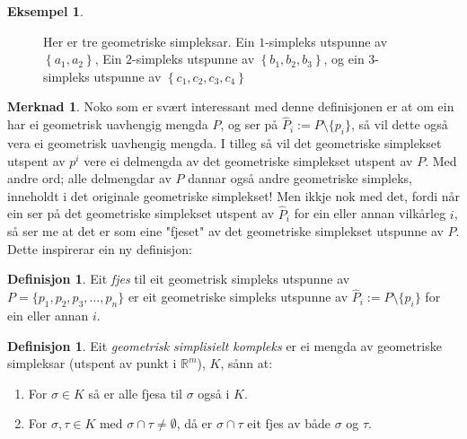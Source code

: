 \documentclass[a4paper, titlepage, 12pt, norsk]{article}
\theoremstyle{plain}
\theoremstyle{definition}
\newtheorem{definition}[theorem]{Definisjon}
\newtheorem{example}[theorem]{Eksempel}
\newtheorem{remark}[theorem]{Merknad}
\newcommand{\Rb}{\mathbb{R}}
\newcommand{\intersect}{ \mathop{\cap}\limits } %
\newcommand{\set}[1]{ \left \{ #1 \right \} } %
\begin{document}
\begin{theroem}
\begin{example}
	\phantom{123}
	\begin{figure}[htbp]
		\begin{center}
			
			\caption{Her er tre geometriske simpleksar. Ein \( 1 \)-simpleks utspunne av \( \set{a_1, a_2} \), Ein \(2\)-simpleks utspunne av \( \set{b_1, b_2, b_3} \), og ein \(3\)-simpleks utspunne av \( \set{c_1, c_2, c_3, c_4} \)}
		\end{center}
	\end{figure}
\end{example}

\begin{remark}
	Noko som er svært interessant med denne definisjonen er at om ein har ei geometrisk uavhengig mengda $P$, og ser på $\hat{P}_i := P \setminus \{p_i\}$, så vil dette også vera ei geometrisk uavhengig mengda. I tilleg så vil det geometriske simplekset utspent av $p^i$ vere ei delmengda av det geometriske simplekset utspent av $P$. Med andre ord; alle delmengdar av $P$ dannar også andre geometriske simpleks, inneholdt i det originale geometriske simplekset! Men ikkje nok med det, fordi når ein ser på det geometriske simplekset utspent av $\hat{P}_i$ for ein eller annan vilkårleg $i$, så ser me at det er som eine "fjeset" av det geometriske simplekset utspunne av $P$. Dette inspirerar ein ny definisjon:
\end{remark}

\begin{definition}
	Eit \emph{fjes} til eit geometrisk simpleks utspunne av $P=\{p_1, p_2, p_3, \dots, p_n\}$ er eit geometriske simpleks utspunne av $\hat{P}_i := P\setminus \{p_i\}$ for ein eller annan $i$.
\end{definition}

\begin{definition} %
	Eit \emph{geometrisk simplisielt kompleks} er ei mengda av geometriske simpleksar (utspent av punkt i $\Rb^m$), $K$, sånn at:
	\begin{enumerate}
		\item{For $\sigma \in K$ så er alle fjesa til $\sigma$ også i $K$.}
		\item{For $\sigma, \tau \in K$ med $\sigma \intersect \tau \neq \emptyset$, då er $\sigma \intersect \tau$ eit fjes av både $\sigma$ og $\tau$.}
	\end{enumerate}
\end{definition}


\end{theroem}
\end{document}
